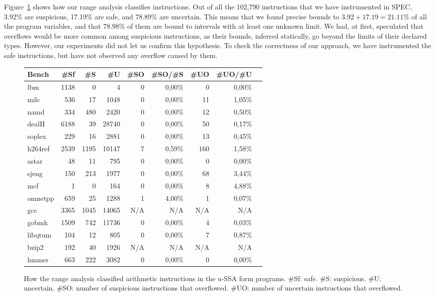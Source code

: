 \documentclass{sigplanconf}[10pt]
\begin{document}
Figure~\ref{fig:classificationTable} shows how our range analysis
classifies instructions.
Out of all the 102,790 instructions that we have instrumented in SPEC,
3.92\% are suspicious, 17.19\% are safe, and 78.89\% are uncertain.
This means that we found precise bounds to $3.92 + 17.19 = 21.11\%$ of all
the program variables, and that 78.98\% of them are bound to intervals with
at least one unknown limit.
We had, at first, speculated that overflows would be more common among
suspicious instructions, as their bounds, inferred statically, go beyond the
limits of their declared types.
However, our experiments did not let us confirm this hypothesis.
To check the correctness of our approach, we have instrumented the safe instructions,
but have not observed any overflow caused by them.

\begin{figure}[t!]
\begin{center}
\begin{scriptsize}
\begin{tabular}{|l|r|r|r|r|r|r|r|r|}
\hline
Bench & \#Sf & \#S & \#U & \#SO & \#SO/\#S & \#UO & \#UO/\#U
\\ \hline
lbm     & 1138 & 0    & 4 & 0 & 0,00\% & 0 & 0,00\% \\ \hline
milc    & 536  & 17   & 1048  & 0 & 0,00\% & 11 & 1,05\% \\ \hline
namd    & 334  & 480  & 2420  & 0 & 0,00\% & 12 & 0,50\% \\ \hline
dealII  & 6188 & 39   & 28740  & 0 & 0,00\% & 50 & 0,17\% \\ \hline
soplex  & 229  & 16   & 2881 & 0 & 0,00\% & 13 & 0,45\% \\ \hline
h264ref & 2539 & 1195 & 10147 & 7 & 0,59\% & 160 & 1,58\% \\ \hline
astar   & 48   & 11   & 795 & 0 & 0,00\% & 0 & 0,00\% \\ \hline
sjeng   & 150  & 213  & 1977 &0 & 0,00\% & 68 & 3,44\% \\ \hline
mcf     & 1    & 0    & 164 & 0 & 0,00\% & 8 & 4,88\% \\ \hline
omnetpp & 659  & 25   & 1288 & 1 & 4,00\% & 1 & 0,07\% \\ \hline
gcc     & 3365 & 1045 & 14065 & N/A & N/A & N/A & N/A \\ \hline
gobmk   & 1509 & 742  & 11736 & 0 & 0,00\% & 4 & 0,03\% \\ \hline
libqtum & 104  & 12   & 805 & 0 & 0,00\% & 7 & 0,87\% \\ \hline
bzip2   & 192  & 40   & 1926 & N/A & N/A & N/A & N/A \\ \hline
hmmer   & 663  & 222  & 3082 & 0 & 0,00\% & 0 & 0,00\% \\ \hline
\end{tabular}
\end{scriptsize}
\end{center}
\caption{\label{fig:classificationTable}
How the range analysis classified arithmetic instructions in the 
u-SSA form programs.
\#Sf: safe.
\#S: suspicious.
\#U: uncertain.
\#SO: number of suspicious instructions that overflowed.
\#UO: number of uncertain instructions that overflowed.
}
\end{figure}
\end{document}
